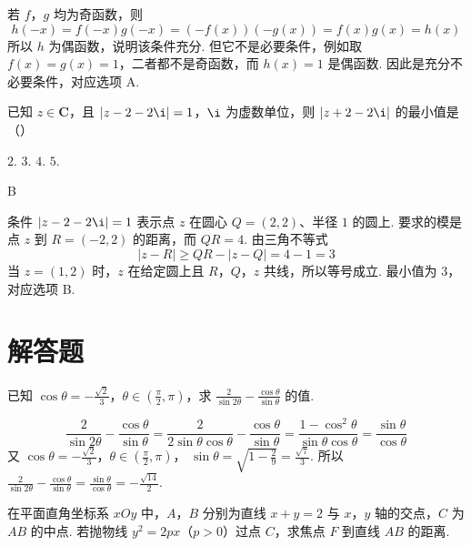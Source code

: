 \begin{solution}
若 \(f\)，\(g\) 均为奇函数，则
\[
h(-x)=f(-x)g(-x)=(-f(x))(-g(x))=f(x)g(x)=h(x)
\]
所以 \(h\) 为偶函数，说明该条件充分. 但它不是必要条件，例如取 \(f(x)=g(x)=1\)，二者都不是奇函数，而 \(h(x)=1\) 是偶函数. 因此是充分不必要条件，对应选项 A.
\end{solution}

\begin{problem}
已知 \(z\in\mathbf{C}\)，且 \(|z-2-2\i|=1\)，\(\i\) 为虚数单位，则 \(|z+2-2\i|\) 的最小值是（\quad）

\choices
    {\(2\).}
    {\(3\).}
    {\(4\).}
    {\(5\).}
\end{problem}

\begin{answer}
B
\end{answer}

\begin{solution}
条件 \(|z-2-2\i|=1\) 表示点 \(z\) 在圆心 \(Q=(2,2)\)、半径 \(1\) 的圆上. 要求的模是点 \(z\) 到 \(R=(-2,2)\) 的距离，而 \(QR=4\). 由三角不等式
\[
|z-R|\geqslant QR-|z-Q|=4-1=3
\]
当 \(z=(1,2)\) 时，\(z\) 在给定圆上且 \(R\)，\(Q\)，\(z\) 共线，所以等号成立. 最小值为 \(3\)，对应选项 B.
\end{solution}

\section{解答题}

\begin{problem}
已知 \(\cos \theta=-\frac{\sqrt{2}}{3}\)，\(\theta\in\left(\frac{\pi}{2},\pi\right)\)，求 \(\frac{2}{\sin 2\theta}-\frac{\cos \theta}{\sin \theta}\) 的值.
\end{problem}

\begin{solution}
\[\frac{2}{\sin 2\theta}-\frac{\cos \theta}{\sin \theta}=\frac{2}{2\sin \theta\cos \theta}-\frac{\cos \theta}{\sin \theta}=\frac{1-\cos^2\theta}{\sin \theta\cos \theta}=\frac{\sin \theta}{\cos \theta}\]
又 \(\cos \theta=-\frac{\sqrt{2}}{3}\)，\(\theta\in\left(\frac{\pi}{2},\pi\right)\)，
\(\sin \theta=\sqrt{1-\frac{2}{9}}=\frac{\sqrt{7}}{3}\).
所以
\(\frac{2}{\sin 2\theta}-\frac{\cos \theta}{\sin \theta}=\frac{\sin \theta}{\cos \theta}=-\frac{\sqrt{14}}{2}\).
\end{solution}

\begin{problem}
在平面直角坐标系 \(xOy\) 中，\(A\)，\(B\) 分别为直线 \(x+y=2\) 与 \(x\)，\(y\) 轴的交点，\(C\) 为 \(AB\) 的中点. 若抛物线 \(y^2=2px\)（\(p>0\)）过点 \(C\)，求焦点 \(F\) 到直线 \(AB\) 的距离.
\end{problem}

